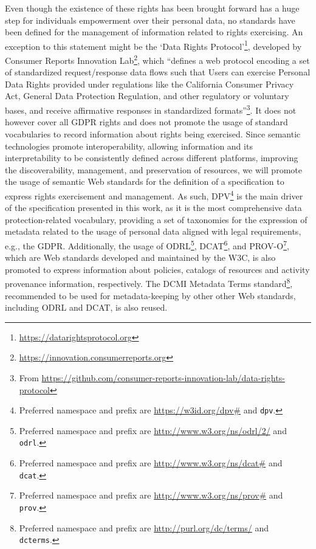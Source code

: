 \documentclass{IOS-Book-Article}     %
\begin{document}
Even though the existence of these rights has been brought forward has a huge step for individuals empowerment over their personal data, no standards have been defined for the management of information related to rights exercising.
An exception to this statement might be the `Data Rights Protocol'\footnote{\url{https://datarightsprotocol.org}}, developed by Consumer Reports Innovation Lab\footnote{\url{https://innovation.consumerreports.org}}, which ``defines a web protocol encoding a set of standardized request/response data flows such that Users can exercise Personal Data Rights provided under regulations like the California Consumer Privacy Act, General Data Protection Regulation, and other regulatory or voluntary bases, and receive affirmative responses in standardized formats''\footnote{From \url{https://github.com/consumer-reports-innovation-lab/data-rights-protocol}}.
It does not however cover all GDPR rights and does not promote the usage of standard vocabularies to record information about rights being exercised.
Since semantic technologies promote interoperability, allowing information and its interpretability to be consistently defined across different platforms, improving the discoverability, management, and preservation of resources, we will promote the usage of semantic Web standards for the definition of a specification to express rights exercisement and management.
As such, DPV\footnote{Preferred namespace and prefix are \url{https://w3id.org/dpv\#} and \texttt{dpv}.}\cite{pandit2024dpv} is the main driver of the specification presented in this work, as it is the most comprehensive data protection-related vocabulary, providing a set of taxonomies for the expression of metadata related to the usage of personal data aligned with legal requirements, e.g., the GDPR.
Additionally, the usage of 
ODRL\footnote{Preferred namespace and prefix are \url{http://www.w3.org/ns/odrl/2/} and \texttt{odrl}.}\cite{iannella_odrl_2018}, 
DCAT\footnote{Preferred namespace and prefix are \url{http://www.w3.org/ns/dcat\#} and \texttt{dcat}.}\cite{albertoni_dcat_2024}, and 
PROV-O\footnote{Preferred namespace and prefix are \url{http://www.w3.org/ns/prov\#} and \texttt{prov}.}\cite{lebo_prov_2013}, 
which are Web standards developed and maintained by the W3C, is also promoted to express information about policies, catalogs of resources and activity provenance information, respectively.
The DCMI Metadata Terms standard\footnote{Preferred namespace and prefix are \url{http://purl.org/dc/terms/} and \texttt{dcterms}.}\cite{dcmi_2020}, recommended to be used for metadata-keeping by other other Web standards, including ODRL and DCAT, is also reused.
\end{document}
